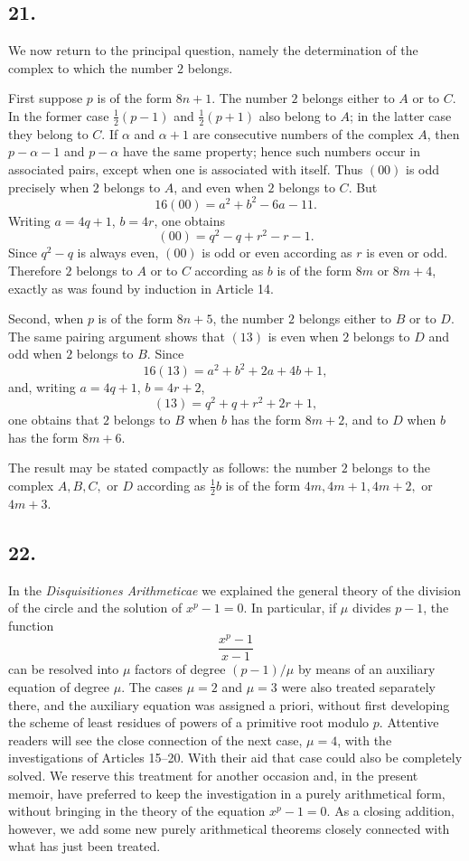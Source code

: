 \documentclass[12pt]{article}
\begin{document}
\subsection*{21.}

We now return to the principal question, namely the determination of the complex to which the number $2$ belongs.

First suppose $p$ is of the form $8n+1$. The number $2$ belongs either to $A$ or to $C$. In the former case $\frac12(p-1)$ and $\frac12(p+1)$ also belong to $A$; in the latter case they belong to $C$. If $\alpha$ and $\alpha+1$ are consecutive numbers of the complex $A$, then $p-\alpha-1$ and $p-\alpha$ have the same property; hence such numbers occur in associated pairs, except when one is associated with itself. Thus $(00)$ is odd precisely when $2$ belongs to $A$, and even when $2$ belongs to $C$. But
\[
16(00)=a^2+b^2-6a-11.
\]
Writing $a=4q+1$, $b=4r$, one obtains
\[
(00)=q^2-q+r^2-r-1.
\]
Since $q^2-q$ is always even, $(00)$ is odd or even according as $r$ is even or odd. Therefore $2$ belongs to $A$ or to $C$ according as $b$ is of the form $8m$ or $8m+4$, exactly as was found by induction in Article 14.

Second, when $p$ is of the form $8n+5$, the number $2$ belongs either to $B$ or to $D$. The same pairing argument shows that $(13)$ is even when $2$ belongs to $D$ and odd when $2$ belongs to $B$. Since
\[
16(13)=a^2+b^2+2a+4b+1,
\]
and, writing $a=4q+1$, $b=4r+2$,
\[
(13)=q^2+q+r^2+2r+1,
\]
one obtains that $2$ belongs to $B$ when $b$ has the form $8m+2$, and to $D$ when $b$ has the form $8m+6$.

The result may be stated compactly as follows: the number $2$ belongs to the complex $A,B,C,$ or $D$ according as $\frac12 b$ is of the form $4m,4m+1,4m+2,$ or $4m+3$.

\subsection*{22.}

In the \emph{Disquisitiones Arithmeticae} we explained the general theory of the division of the circle and the solution of $x^p-1=0$. In particular, if $\mu$ divides $p-1$, the function
\[
\frac{x^p-1}{x-1}
\]
can be resolved into $\mu$ factors of degree $(p-1)/\mu$ by means of an auxiliary equation of degree $\mu$. The cases $\mu=2$ and $\mu=3$ were also treated separately there, and the auxiliary equation was assigned a priori, without first developing the scheme of least residues of powers of a primitive root modulo $p$. Attentive readers will see the close connection of the next case, $\mu=4$, with the investigations of Articles 15--20. With their aid that case could also be completely solved. We reserve this treatment for another occasion and, in the present memoir, have preferred to keep the investigation in a purely arithmetical form, without bringing in the theory of the equation $x^p-1=0$. As a closing addition, however, we add some new purely arithmetical theorems closely connected with what has just been treated.
\end{document}

